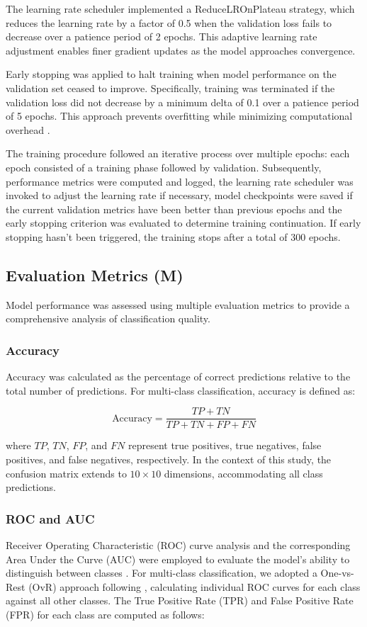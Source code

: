 \documentclass[a4paper]{article}
\begin{document}
The learning rate scheduler implemented a ReduceLROnPlateau strategy, which reduces the learning rate by a factor of 0.5 when the validation loss fails to decrease over a patience period of 2 epochs. This adaptive learning rate adjustment enables finer gradient updates as the model approaches convergence.

Early stopping was applied to halt training when model performance on the validation set ceased to improve. Specifically, training was terminated if the validation loss did not decrease by a minimum delta of 0.1 over a patience period of 5 epochs. This approach prevents overfitting while minimizing computational overhead \citep{prechelt2002}.

The training procedure followed an iterative process over multiple epochs: each epoch consisted of a training phase followed by validation. Subsequently, performance metrics were computed and logged, the learning rate scheduler was invoked to adjust the learning rate if necessary, model checkpoints were saved if the current validation metrics have been better than previous epochs and the early stopping criterion was evaluated to determine training continuation. If early stopping hasn't been triggered, the training stops after a total of 300 epochs.
\subsection{Evaluation Metrics (M)}
Model performance was assessed using multiple evaluation metrics to provide a comprehensive analysis of classification quality.
\subsubsection{Accuracy}
Accuracy was calculated as the percentage of correct predictions relative to the total number of predictions. For multi-class classification, accuracy is defined as:

\begin{equation}
\text{Accuracy} = \frac{TP + TN}{TP + TN + FP + FN}
\end{equation}

where $TP$, $TN$, $FP$, and $FN$ represent true positives, true negatives, false positives, and false negatives, respectively. In the context of this study, the confusion matrix extends to $10 \times 10$ dimensions, accommodating all class predictions.

\subsubsection{ROC and AUC}
Receiver Operating Characteristic (ROC) curve analysis and the corresponding Area Under the Curve (AUC) were employed to evaluate the model's ability to distinguish between classes \citep{hand2001}. For multi-class classification, we adopted a One-vs-Rest (OvR) approach following \cite{fawcett2006}, calculating individual ROC curves for each class against all other classes. The True Positive Rate (TPR) and False Positive Rate (FPR) for each class are computed as follows:
\end{document}
